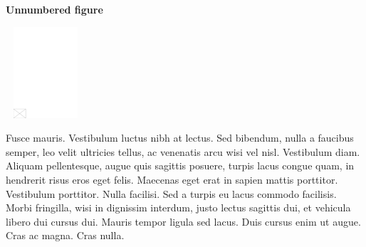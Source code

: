 \documentclass[AMA,Times1COL]{WileyNJDv5} %
\begin{document}

\noindent\textbf{Unnumbered figure}


\begin{center}
\includegraphics[width=7pc,height=8pc,draft]{empty}
\end{center}


Fusce mauris. Vestibulum luctus nibh at lectus. Sed bibendum, nulla a faucibus semper, leo velit ultricies tellus, ac
venenatis arcu wisi vel nisl. Vestibulum diam. Aliquam pellentesque, augue quis sagittis posuere, turpis lacus congue
quam, in hendrerit risus eros eget felis. Maecenas eget erat in sapien mattis porttitor. Vestibulum porttitor. Nulla
facilisi. Sed a turpis eu lacus commodo facilisis. Morbi fringilla, wisi in dignissim interdum, justo lectus sagittis dui, et
vehicula libero dui cursus dui. Mauris tempor ligula sed lacus. Duis cursus enim ut augue. Cras ac magna. Cras nulla.
\end{document}
